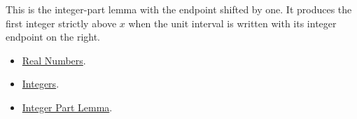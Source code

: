 \begin{remark*}[Interpretation]
This is the integer-part lemma with the endpoint shifted by one.  It produces
the first integer strictly above $x$ when the unit interval is written with its
integer endpoint on the right.
\end{remark*}

\begin{dependencies}
\begin{itemize}
\item \hyperref[def:reals]{Real Numbers}.
\item \hyperref[def:integers]{Integers}.
\item \hyperref[lem:integer-part-lemma]{Integer Part Lemma}.
\end{itemize}
\end{dependencies}



